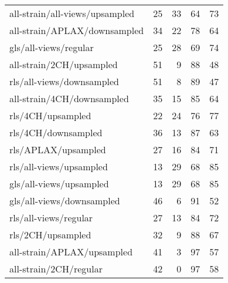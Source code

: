 \begin{longtable}{lrrrr}
    all-strain/all-views/upsampled   & 25 & 33 & 64 & 73 \\
    all-strain/APLAX/downsampled     & 34 & 22 & 78 & 64 \\
    gls/all-views/regular            & 25 & 28 & 69 & 74 \\
    all-strain/2CH/upsampled         & 51 &  9 & 88 & 48 \\
    rls/all-views/downsampled        & 51 &  8 & 89 & 47 \\
    all-strain/4CH/downsampled       & 35 & 15 & 85 & 64 \\
    rls/4CH/upsampled                & 22 & 24 & 76 & 77 \\
    rls/4CH/downsampled              & 36 & 13 & 87 & 63 \\
    rls/APLAX/upsampled              & 27 & 16 & 84 & 71 \\
    rls/all-views/upsampled          & 13 & 29 & 68 & 85 \\
    gls/all-views/upsampled          & 13 & 29 & 68 & 85 \\
    gls/all-views/downsampled        & 46 &  6 & 91 & 52 \\
    rls/all-views/regular            & 27 & 13 & 84 & 72 \\
    rls/2CH/upsampled                & 32 &  9 & 88 & 67 \\
    all-strain/APLAX/upsampled       & 41 &  3 & 97 & 57 \\
    all-strain/2CH/regular           & 42 &  0 & 97 & 58 \\
    \hline
\end{longtable}

